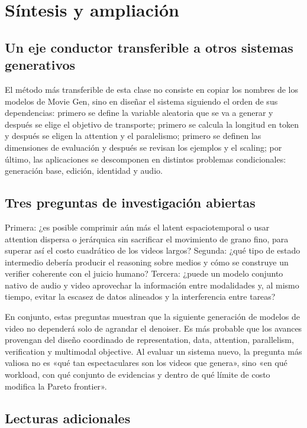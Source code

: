 \documentclass[a4paper]{article}
\begin{document}
\section{Síntesis y ampliación}

\subsection{Un eje conductor transferible a otros sistemas generativos}

El método más transferible de esta clase no consiste en copiar los nombres de los modelos de Movie Gen, sino en diseñar el sistema siguiendo el orden de sus dependencias: primero se define la variable aleatoria que se va a generar y después se elige el objetivo de transporte; primero se calcula la longitud en token y después se eligen la attention y el paralelismo; primero se definen las dimensiones de evaluación y después se revisan los ejemplos y el scaling; por último, las aplicaciones se descomponen en distintos problemas condicionales: generación base, edición, identidad y audio.

\subsection{Tres preguntas de investigación abiertas}

Primera: ¿es posible comprimir aún más el latent espaciotemporal o usar attention dispersa o jerárquica sin sacrificar el movimiento de grano fino, para superar así el costo cuadrático de los videos largos? Segunda: ¿qué tipo de estado intermedio debería producir el reasoning sobre medios y cómo se construye un verifier coherente con el juicio humano? Tercera: ¿puede un modelo conjunto nativo de audio y video aprovechar la información entre modalidades y, al mismo tiempo, evitar la escasez de datos alineados y la interferencia entre tareas?

En conjunto, estas preguntas muestran que la siguiente generación de modelos de video no dependerá solo de agrandar el denoiser. Es más probable que los avances provengan del diseño coordinado de representation, data, attention, parallelism, verification y multimodal objective. Al evaluar un sistema nuevo, la pregunta más valiosa no es «qué tan espectaculares son los videos que genera», sino «en qué workload, con qué conjunto de evidencias y dentro de qué límite de costo modifica la Pareto frontier».

\subsection{Lecturas adicionales}
\end{document}
